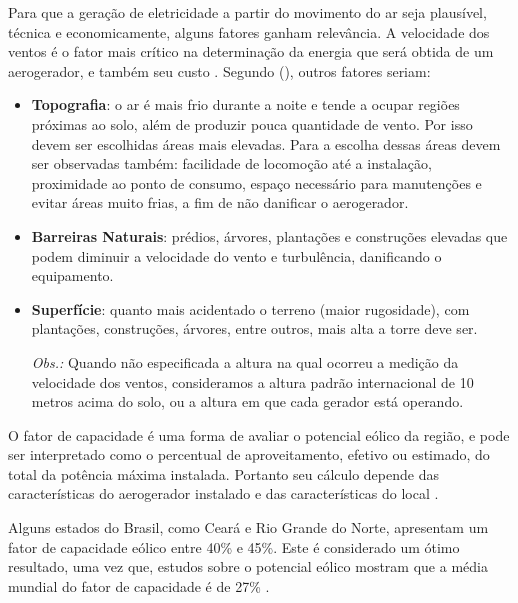     Para que a geração de eletricidade a partir do movimento do ar seja plausível, técnica e economicamente, alguns fatores
    ganham relevância. A velocidade dos ventos é o fator mais crítico na determinação da energia que será obtida de um
    aerogerador, e também seu custo \cite{terciote02}. Segundo \citeauthor{terciote02} (\citeyear{terciote02}), outros fatores seriam:
    \begin{itemize}
     \item \textbf{Topografia}: o ar é mais frio durante a noite e tende a ocupar regiões próximas ao solo, além de produzir
	pouca quantidade de vento. Por isso devem ser escolhidas áreas mais elevadas. Para a escolha dessas áreas devem ser
	observadas também: facilidade de locomoção até a instalação, proximidade ao ponto de consumo, espaço necessário
	para manutenções e evitar áreas muito frias, a fim de não danificar o aerogerador.
	
     \item \textbf{Barreiras Naturais}: prédios, árvores, plantações e construções elevadas que podem diminuir
	a velocidade do vento e turbulência, danificando o equipamento.
      
     \item \textbf{Superfície}: quanto mais acidentado o terreno (maior rugosidade), com plantações, construções, árvores, entre outros,
	mais alta a torre deve ser.
      
     \textit{Obs.:} Quando não especificada a altura na qual ocorreu a medição da velocidade dos ventos,
	consideramos a altura padrão internacional de 10 metros acima do solo, ou a altura em que cada gerador está operando. 
     
    \end{itemize}
    
    O fator de capacidade é uma forma de avaliar o potencial eólico da região, e pode ser interpretado como o percentual 
    de aproveitamento, efetivo ou estimado, do total da potência máxima instalada. Portanto seu cálculo depende das 
    características do aerogerador instalado e das características do local \cite{amaral12}.
    
    Alguns estados do Brasil, como Ceará e Rio Grande do Norte, apresentam um fator de capacidade eólico entre 40\% e 45\%.
    Este é considerado um ótimo resultado, uma vez que, estudos sobre o potencial eólico mostram que a média mundial do fator
    de capacidade é de 27\% \cite{amaral12}.
    
    \nocite{cbee}